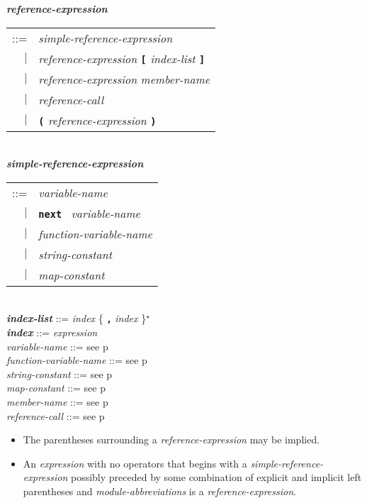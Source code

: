 \documentclass[12pt]{article}
\newcommand{\TT}[1]{{\tt \bfseries #1}}
\newcommand{\STAR}{{\Large $^\star$}}
\newcommand{\emkey}[1]{{\em \bfseries #1}}
\newcommand{\pagref}[1]{p\pageref{#1}}
\newenvironment{indpar}[1][0.3in]%
	{\begin{list}{}%
		     {\setlength{\itemsep}{0in}%
		      \setlength{\topsep}{0in}%
		      \setlength{\parsep}{1ex}%
		      \setlength{\labelwidth}{#1}%
		      \setlength{\leftmargin}{#1}%
		      \addtolength{\leftmargin}{\labelsep}}%
	 \item}%
	{\end{list}}
\begin{document}
\begin{indpar}
\emkey{reference-expression}\label{REFERENCE-EXPRESSION}
    \begin{tabular}[t]{rl}
    ::= & {\em simple-reference-expression} \\
    $|$ & {\em reference-expression} \TT{[} {\em index-list} \TT{]} \\
    $|$ & {\em reference-expression} {\em member-name} \\
    $|$ & {\em reference-call} \\
    $|$ & \TT{(} {\em reference-expression} \TT{)} \\
    \end{tabular}
\\[0.5ex]
\emkey{simple-reference-expression}\label{SIMPLE-REFERENCE-EXPRESSION}
    \begin{tabular}[t]{rl}
    ::= & {\em variable-name} \\
    $|$ & \TT{next}~ {\em variable-name} \\
    $|$ & {\em function-variable-name} \\
    $|$ & {\em string-constant} \\
    $|$ & {\em map-constant} \\
    \end{tabular}
\\[0.5ex]
\emkey{index-list} ::= {\em index} \{ \TT{,} {\em index} \}\STAR{}
\\[0.5ex]
\emkey{index}\label{REFERENCE-INDEX}
    ::= {\em expression}
\\[0.5ex]
{\em variable-name} ::= see \pagref{VARIABLE-NAME}
\\[0.5ex]
{\em function-variable-name} ::= see \pagref{FUNCTION-VARIABLE-NAME}
\\[0.5ex]
{\em string-constant} ::= see \pagref{STRING-CONSTANT}
\\[0.5ex]
{\em map-constant} ::= see \pagref{MAP-CONSTANT}
\\[0.5ex]
{\em member-name} ::= see \pagref{MEMBER-NAME}
\\[0.5ex]
{\em reference-call} ::= see \pagref{REFERENCE-CALL}
\begin{itemize}
\item The parentheses surrounding a {\em reference-expression}
may be implied.
\item
An {\em expression} with no operators that begins
with a {\em simple-reference-expression} possibly preceded by some
combination of explicit and implicit left parentheses and
{\em module-abbreviations}
is a {\em reference-expression}.


\end{itemize}
\end{indpar}
\end{document}
